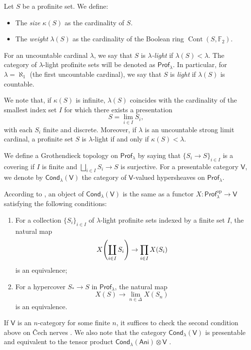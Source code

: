 \begin{definition}
    Let $S$ be a profinite set. We define:
    \begin{itemize}
        \item The \emph{size} $\kappa(S)$ as the cardinality of $S$.
        \item The \emph{weight} $\lambda(S)$ as the cardinality of the Boolean ring $\operatorname{Cont}(S,\mathbb{F}_2)$.
    \end{itemize}
    For an uncountable cardinal $\lambda$, we say that $S$ is $\lambda$\emph{-light} if $\lambda(S)< \lambda$. The category of $\lambda$-light profinite sets will be denoted as $\mathsf{Prof}_\lambda$. In particular, for $\lambda=\aleph_1$ (the first uncountable cardinal), we say that $S$ is \emph{light} if $\lambda(S)$ is countable.
\end{definition}

We note that, if $\kappa(S)$ is infinite, $\lambda(S)$ coincides with the cardinality of the smallest index set $I$ for which there exists a presentation
\[S=\lim_{i\in I}S_i,\]
with each $S_i$ finite and discrete. Moreover, if $\lambda$ is an uncountable strong limit cardinal, a profinite set $S$ is $\lambda$-light if and only if $\kappa(S)<\lambda$.

\begin{definition}
    We define a Grothendieck topology on $\mathsf{Prof}_\lambda$ by saying that $\{S_i\to S\}_{i\in I}$ is a covering if $I$ is finite and $\bigsqcup_{i\in I}S_i\to S$ is surjective. For a presentable category $\mathsf{V}$, we denote by $\mathsf{Cond}_\lambda(\mathsf{V})$ the category of $\mathsf{V}$-valued hypersheaves on $\mathsf{Prof}_\lambda$.
\end{definition}

According to \cite[Prop.~A.5.7.2]{lurie2018spectral}, an object of $\mathsf{Cond}_\lambda(\mathsf{V})$ is the same as a functor $X\colon \mathsf{Prof}_\lambda^{\mathrm{op}}\to \mathsf{V}$ satisfying the following conditions:
\begin{enumerate}[label=(\roman*)]
    \item For a collection $\{S_i\}_{i\in I}$ of $\lambda$-light profinite sets indexed by a finite set $I$, the natural map
    \[X\mleft(\coprod_{i\in I}S_i\mright)\to \prod_{i\in I}X(S_i)\]
    is an equivalence;
    \item For a hypercover $S_\ast\to S$ in $\mathsf{Prof}_\lambda$, the natural map
    \[X(S)\to \lim_{n\in \Delta}X(S_n)\]
    is an equivalence.
\end{enumerate}
If $\mathsf{V}$ is an $n$-category for some finite $n$, it suffices to check the second condition above on \v{C}ech nerves \cite[Lem.~6.5.2.9]{lurie2009HTT}. We also note that the category $\mathsf{Cond}_\lambda(\mathsf{V})$ is presentable and equivalent to the tensor product $\mathsf{Cond}_\lambda(\mathsf{Ani})\otimes \mathsf{V}$ \cite[Lem.~A.4.22]{heyer20246functorformalismssmoothrepresentations}.

